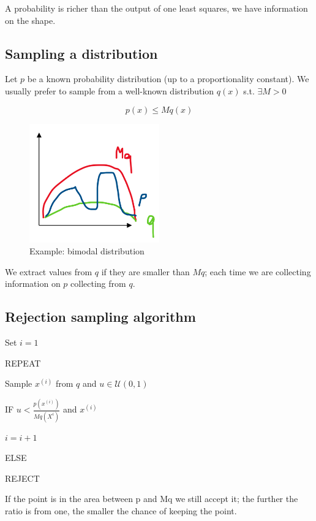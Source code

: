 A probability is richer than the output of one least squares, we have
information on the shape.

\hypertarget{sampling-a-distribution}{%
\subsection{Sampling a distribution}\label{sampling-a-distribution}}

Let $p$ be a known probability distribution (up to a proportionality
constant). We usually prefer to sample from a well-known distribution
$q(x)$ s.t. $\exists M>0$

$$
p(x) \leq M q(x)
$$


\begin{figure}
\centering
\includegraphics[width=0.5\textwidth]{distribution.png}
\caption{Example: bimodal distribution}
\end{figure}

We extract values from $q$ if they are smaller than $Mq$; each time we
are collecting information on $p$ collecting from $q$.

\hypertarget{rejection-sampling-algorithm}{%
\subsection{Rejection sampling
algorithm}\label{rejection-sampling-algorithm}}

Set $i=1$

REPEAT

Sample $x^{(i)}$ from $q$ and $u \in \mathcal{U}(0,1)$

IF $u < \frac{p(x^{(i)})}{Mq(X^i)}$ and $x^{(i)}$

$i=i+1$

ELSE

REJECT

If the point is in the area between p and Mq we still accept it; the
further the ratio is from one, the smaller the chance of keeping the
point.


